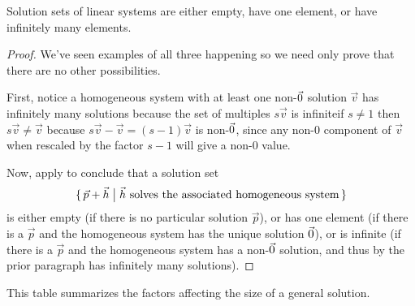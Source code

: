 \begin{corollary}
Solution sets of linear systems are either empty, have one element, or
have infinitely many elements.
\end{corollary}

\begin{proof}
We've seen examples of all three happening so we need only prove
that there are no other possibilities.

First, notice a homogeneous system with
at least one  non-\( \vec{0} \) solution $\vec{v}$ has infinitely many
solutions because the set of multiples $s\vec{v}$
is infinite\Dash if $s\neq 1$ then $s\vec{v}\neq\vec{v}$ because
$s\vec{v}-\vec{v}=(s-1)\vec{v}$ is
non-$\vec{0}$, since any non-$0$ component of $\vec{v}$ when 
rescaled by the factor $s-1$ will give a non-$0$ value.

Now, apply  to conclude that a solution set
\begin{equation*}
  \mbox{$\{\,\vec{p}+\vec{h}\bigm|
    \text{\( \vec{h} \) solves the associated homogeneous system}\,\}$}
\end{equation*}
is either empty (if there is no particular solution \( \vec{p} \)),
or has one element (if there is a \( \vec{p} \) and the homogeneous system
has the unique solution \( \vec{0} \)), or is infinite (if there is a
\( \vec{p} \) and the homogeneous system has a non-$\vec{0}$ solution,
and thus by the prior paragraph has infinitely many solutions).
\end{proof}

This table summarizes the factors affecting the size of a
general solution.

